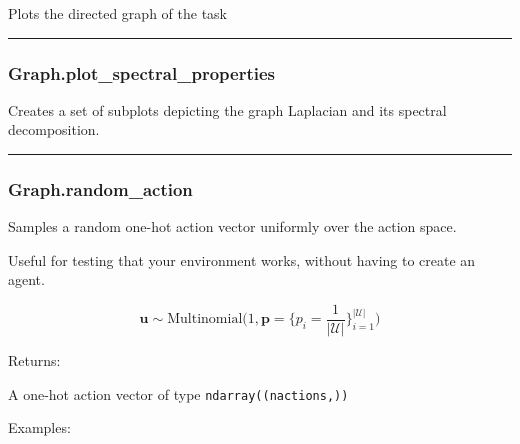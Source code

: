Plots the directed graph of the task

\begin{center}\rule{0.5\linewidth}{\linethickness}\end{center}

\subsubsection{Graph.plot\_spectral\_properties}\label{graph.plot_spectral_properties}

\begin{Shaded}
\begin{Highlighting}[]
\OperatorTok{=}\OperatorTok{=}\OperatorTok{=}\NormalTok{)}
\end{Highlighting}
\end{Shaded}

Creates a set of subplots depicting the graph Laplacian and its spectral
decomposition.

\begin{center}\rule{0.5\linewidth}{\linethickness}\end{center}

\subsubsection{Graph.random\_action}\label{graph.random_action}

\begin{Shaded}
\begin{Highlighting}[]
\NormalTok{)}
\end{Highlighting}
\end{Shaded}

Samples a random one-hot action vector uniformly over the action space.

Useful for testing that your environment works, without having to create
an agent.

\[
\mathbf u \sim \mathrm{Multinomial}\Big(1, \mathbf p=\{p_i = \frac{1}{|\mathcal U|}\}_{i=1}^{|\mathcal U|}\Big)
\]

Returns:

A one-hot action vector of type \texttt{ndarray((nactions,))}

Examples:

